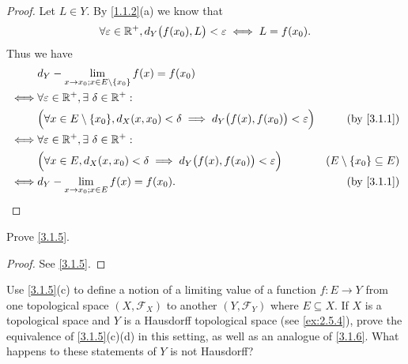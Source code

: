 \begin{proof}
  Let \(L \in Y\).
  By \cref{1.1.2}(a) we know that
  \[
    \forall \varepsilon \in \mathbb{R}^+, d_Y\big(f(x_0), L\big) < \varepsilon \iff L = f(x_0).
  \]
  Thus we have
  \begin{align*}
         & d_Y - \lim_{x \to x_0 ; x \in E \setminus \{x_0\}} f(x) = f(x_0)                                                                                       \\
    \iff & \forall \varepsilon \in \R^+, \exists\ \delta \in \R^+ :                                                                                               \\
         & \Big(\forall x \in E \setminus \{x_0\}, d_X(x, x_0) < \delta \implies d_Y\big(f(x), f(x_0)\big) < \varepsilon\Big) & \text{(by \cref{3.1.1})}          \\
    \iff & \forall \varepsilon \in \R^+, \exists\ \delta \in \R^+ :                                                                                               \\
         & \Big(\forall x \in E, d_X(x, x_0) < \delta \implies d_Y\big(f(x), f(x_0)\big) < \varepsilon\Big)                   & (E \setminus \{x_0\} \subseteq E) \\
    \iff & d_Y - \lim_{x \to x_0 ; x \in E} f(x) = f(x_0).                                                                    & \text{(by \cref{3.1.1})}
  \end{align*}
\end{proof}

\begin{ex}\label{ex:3.1.2}
  Prove \cref{3.1.5}.
\end{ex}

\begin{proof}
  See \cref{3.1.5}.
\end{proof}

\begin{ex}\label{ex:3.1.3}
  Use \cref{3.1.5}(c) to define a notion of a limiting value of a function \(f : E \to Y\) from one topological space \((X, \mathcal{F}_X)\) to another \((Y, \mathcal{F}_Y)\) where \(E \subseteq X\).
  If \(X\) is a topological space and \(Y\) is a Hausdorff topological space (see \cref{ex:2.5.4}), prove the equivalence of \cref{3.1.5}(c)(d) in this setting, as well as an analogue of \cref{3.1.6}.
  What happens to these statements of \(Y\) is not Hausdorff?
\end{ex}


